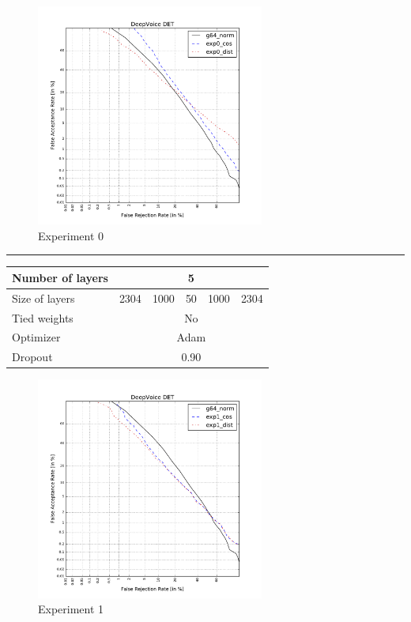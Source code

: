 \documentclass[conference]{IEEEtran}
\begin{document}
\begin{figure}[!h]
    \centering
    \includegraphics[width=7.5cm]{../scores/det0.pdf}
    \captionsetup{labelformat=empty}
    \caption{Experiment 0}
\end{figure}

\hrule
\vspace{0.5cm}

\begin{table}[!h]
\centering
\begin{tabular}{|l|c|c|c|c|c|}
\hline
Number of layers & \multicolumn{5}{c|}{5}                \\ \hline
Size of layers   & 2304   & 1000   & 50  & 1000  & 2304  \\ \hline
Tied weights     & \multicolumn{5}{c|}{No}               \\ \hline
Optimizer        & \multicolumn{5}{c|}{Adam} \\ \hline
Dropout          & \multicolumn{5}{c|}{0.90} \\ \hline
\end{tabular}
\end{table}

\begin{figure}[!h]
    \centering
    \includegraphics[width=7.5cm]{../scores/det1.pdf}
    \captionsetup{labelformat=empty}
    \caption{Experiment 1}
\end{figure}
\end{document}
